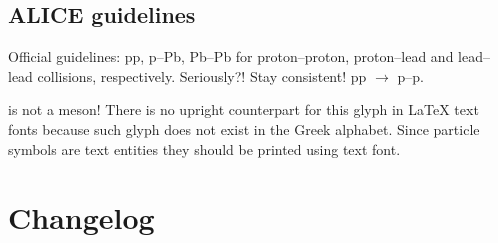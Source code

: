 \documentclass[12pt,a4paper]{article}
\begin{document}
\subsection{ALICE guidelines}

Official guidelines: pp, p--Pb, Pb--Pb for proton--proton, proton--lead and lead--lead collisions, respectively. Seriously?!
Stay consistent! pp \( \rightarrow \) p--p.

\ml{\phi} is not a meson!
There is no upright counterpart for this glyph in \LaTeX{} text fonts because such glyph does not exist in the Greek alphabet.
Since particle symbols are text entities they should be printed using text font.

\appendix

\section{Changelog}



\end{document}
